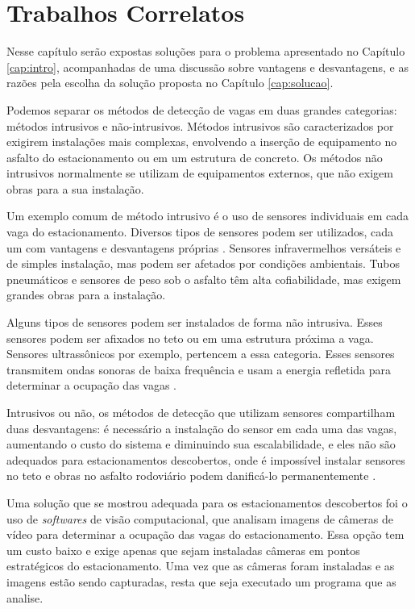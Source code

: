 \chapter{Trabalhos Correlatos} \label{cap:trabalhos}

Nesse capítulo serão expostas soluções para o problema apresentado no Capítulo \ref{cap:intro}, acompanhadas de uma discussão sobre vantagens e desvantagens, e as razões pela escolha da solução proposta no Capítulo \ref{cap:solucao}.

Podemos separar os métodos de detecção de vagas em duas grandes categorias: métodos intrusivos e não-intrusivos. Métodos intrusivos são caracterizados por exigirem instalações mais complexas, envolvendo a inserção de equipamento no asfalto do estacionamento ou em um estrutura de concreto. Os métodos não intrusivos normalmente se utilizam de equipamentos externos, que não exigem obras para a sua instalação.

Um exemplo comum de método intrusivo é o uso de sensores individuais em cada vaga do estacionamento. Diversos tipos de sensores podem ser utilizados, cada um com vantagens e desvantagens próprias \cite{idris09}. Sensores infravermelhos versáteis e de simples instalação, mas podem ser afetados por condições ambientais. Tubos pneumáticos e sensores de peso sob o asfalto têm alta cofiabilidade, mas exigem grandes obras para a instalação. 

Alguns tipos de sensores podem ser instalados de forma não intrusiva. Esses sensores podem ser afixados no teto ou em uma estrutura próxima a vaga. Sensores ultrassônicos por exemplo, pertencem a essa categoria. Esses sensores transmitem ondas sonoras de baixa frequência e usam a energia refletida para determinar a ocupação das vagas \cite{kianpisheh2012smart}.

Intrusivos ou não, os métodos de detecção que utilizam sensores compartilham duas desvantagens: é necessário a instalação do sensor em cada uma das vagas, aumentando o custo do sistema e diminuindo sua escalabilidade, e eles não são adequados para estacionamentos descobertos, onde é impossível instalar sensores no teto e obras no asfalto rodoviário podem danificá-lo permanentemente \cite{idris09}.

Uma solução que se mostrou adequada para os estacionamentos descobertos foi o uso de \textit{softwares} de visão computacional, que analisam imagens de câmeras de vídeo para determinar a ocupação das vagas do estacionamento. Essa opção tem um custo baixo e exige apenas que sejam instaladas câmeras em pontos estratégicos do estacionamento. Uma vez que as câmeras foram instaladas e as imagens estão sendo capturadas, resta que seja executado um programa que as analise.

